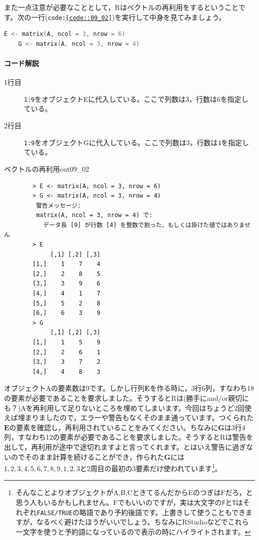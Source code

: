 \documentclass{ltjsbook}
\begin{document}
また一点注意が必要なこととして，Rはベクトルの再利用をするということです。次の一行(\texttt{code:\ref{code::09_02}})を実行して中身を見てみましょう。

\begin{lstlisting}[language=c++,label={code::09_02},caption={ベクトルデータの保持}]
    E <- matrix(A, ncol = 3, nrow = 6)
    G <- matrix(A, ncol = 3, nrow = 4)
\end{lstlisting}
\paragraph{コード解説}
\begin{description}
    \item[1行目] \texttt{1:9}をオブジェクトEに代入している。ここで列数は3，行数は6を指定している。
    \item[2行目] \texttt{1:9}をオブジェクトGに代入している。ここで列数は3，行数は4を指定している。
\end{description}

\begin{Rscreen}{ベクトルの再利用}{out09_02}
    \begin{verbatim}
        > E <- matrix(A, ncol = 3, nrow = 6)
        > G <- matrix(A, ncol = 3, nrow = 4)
         警告メッセージ: 
         matrix(A, ncol = 3, nrow = 4) で: 
           データ長 [9] が行数 [4] を整数で割った、もしくは掛けた値ではありません 
        > E
             [,1] [,2] [,3]
        [1,]    1    7    4
        [2,]    2    8    5
        [3,]    3    9    6
        [4,]    4    1    7
        [5,]    5    2    8
        [6,]    6    3    9
        > G
             [,1] [,2] [,3]
        [1,]    1    5    9
        [2,]    2    6    1
        [3,]    3    7    2
        [4,]    4    8    3
\end{verbatim}
\end{Rscreen}

オブジェクトAの要素数は9です。しかし行列$\bm{E}$を作る時に，3行6列，すなわち18の要素が必要であることを要求しました。そうするとRは(勝手にand/or親切にも？)Aを再利用して足りないところを埋めてしまいます。今回はちょうど2回使えば埋まりましたので，エラーや警告もなくそのまま通っています。つくられた$\bm{E}$の要素を確認し，再利用されていることをみてください。ちなみに$\bm{G}$は3行4列，すなわち12の要素が必要であることを要求しました。そうするとRは警告を出して，再利用が途中で途切れますよと言ってくれます。とはいえ警告に過ぎないのでそのまま計算を続けることができ，作られた$\bm{G}$には$1,2,3,4,5,6,7,8,9,1,2,3$と2周目の最初の3要素だけ使われています\footnote{そんなことよりオブジェクトがA,B,CときてるんだからEのつぎはFだろ，と思う人もいるかもしれません。Fでもいいのですが，実は大文字の\texttt{F}と\texttt{T}はそれぞれ\texttt{FALSE/TRUE}の略語であり予約後語です。上書きして使うこともできますが，なるべく避けたほうがいいでしょう。ちなみにRStudioなどでこれら一文字を使うと予約語になっているので表示の時にハイライトされます。}。
\end{document}
